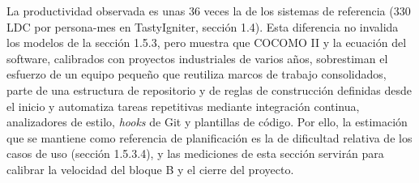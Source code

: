 La productividad observada es unas 36 veces la de los sistemas de referencia (330 LDC por persona-mes en TastyIgniter, sección 1.4). Esta diferencia no invalida los modelos de la sección 1.5.3, pero muestra que COCOMO II y la ecuación del software, calibrados con proyectos industriales de varios años, sobrestiman el esfuerzo de un equipo pequeño que reutiliza marcos de trabajo consolidados, parte de una estructura de repositorio y de reglas de construcción definidas desde el inicio y automatiza tareas repetitivas mediante integración continua, analizadores de estilo, \textit{hooks} de Git y plantillas de código. Por ello, la estimación que se mantiene como referencia de planificación es la de dificultad relativa de los casos de uso (sección 1.5.3.4), y las mediciones de esta sección servirán para calibrar la velocidad del bloque B y el cierre del proyecto.
